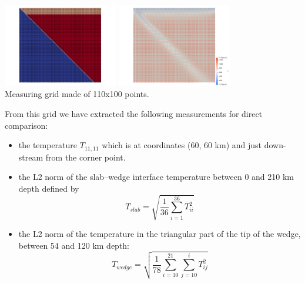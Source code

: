 \begin{center}
\includegraphics[width=5cm]{python_codes/fieldstone_68/images/grid1}
\includegraphics[width=5cm]{python_codes/fieldstone_68/images/grid2}\\
{\captionfont Measuring grid made of 110x100 points.}
\end{center}

From this grid we have extracted the following measurements for direct comparison:
\begin{itemize}
\item the temperature $T_{11,11}$ which is at coordinates (60, 60 km) and
just down-stream from the corner point.
\item the L2 norm of the slab–wedge interface temperature between
0 and 210 km depth defined by
\[
T_{slab} = \sqrt{\frac{1}{36} \sum_{i=1}^{36} T_{ii}^2  }
\]
\item 
the L2 norm of the temperature in the triangular part of the
tip of the wedge, between 54 and 120 km depth:
\[
T_{wedge} = \sqrt{ \frac{1}{78} \sum_{i=10}^{21} \sum_{j=10}^i T_{ij}^2   }
\]
\end{itemize}

